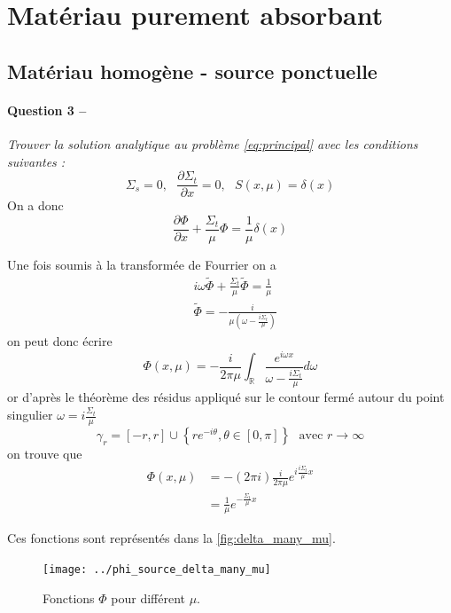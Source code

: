 \documentclass[11pt,a4paper]{article}
\newcommand{\dx}[1]{\dfrac{\partial #1}{\partial x}}
\newcommand{\question}[2]{\paragraph{Question #1 --}\hspace{-7pt}\textit{#2} \\}
\newcommand{\tphi}{\widetilde{\Phi}}
\begin{document}
\section{Matériau purement absorbant}

\subsection{Matériau homogène - source ponctuelle}

\question{3}{Trouver la solution analytique au problème \autoref{eq:principal} avec les conditions suivantes :}

\begin{equation}
  \Sigma_s=0, ~~~ \dx{\Sigma_t} = 0, ~~~ S(x, \mu) = \delta(x)
\end{equation}
On a donc 
\begin{equation}
  \dx{\Phi} + \frac{\Sigma_t}{\mu} \Phi = \frac{1}{\mu} \delta(x)
\end{equation}

Une fois soumis à la transformée de Fourrier on a 
\begin{align}
  &i \omega \tphi + \frac{\Sigma_t}{\mu} \tphi = \frac{1}{\mu} \\
  &\tphi = -\frac{i}{\mu\left(\omega - \frac{i \Sigma_t}{\mu}\right)}
\end{align}
on peut donc écrire 
\begin{equation}
  \Phi (x, \mu) = -\frac{i}{2\pi\mu} \int_{\mathbb{R}} \frac{e^{i\omega x}}{\omega - \frac{i \Sigma_t}{\mu}} d\omega 
\end{equation}
or d'après le théorème des résidus appliqué sur le contour fermé autour du point singulier $\omega = i\frac{\Sigma_t}{\mu}$
\begin{equation}
  \gamma_r = [-r,r]\cup\left\{r e^{-i \theta}, \theta \in [0, \pi] \right\} ~~~ \mbox{avec } r \to \infty
\end{equation}
on trouve que
\begin{align}
  \Phi (x, \mu) &= - (2 \pi i) \frac{i}{2\pi\mu} e^{i \frac{i \Sigma_t}{\mu} x} \\
                &= \frac{1}{\mu} e^{-\frac{\Sigma_t}{\mu} x} 
\end{align}

Ces fonctions sont représentés dans la \autoref{fig:delta_many_mu}.

\begin{figure}
  \centering
  \texttt{[image: ../phi\_source\_delta\_many\_mu]}
  \caption{Fonctions $\Phi$ pour différent $\mu$.}
  \label{fig:delta_many_mu}
\end{figure}
\end{document}
